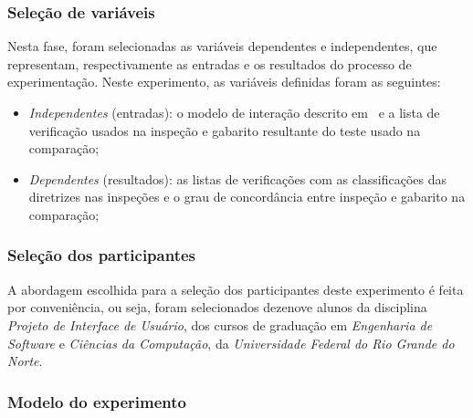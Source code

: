 \subsubsection{Seleção de variáveis}
\label{variablesSelection}

Nesta   fase,   foram   selecionadas   as  variáveis   dependentes   e
independentes,  que  representam,  respectivamente  as entradas  e  os
resultados  do  processo  de  experimentação.  Neste  experimento,  as
variáveis definidas foram as seguintes:

\begin{itemize}

  \item {\em Independentes} (entradas): o modelo de interação descrito
    em \aladim\ e a lista de verificação usados na inspeção e gabarito
    resultante do teste usado na comparação;

  \item {\em Dependentes} (resultados):  as listas de verificações com
    as  classificações  das  diretrizes  nas  inspeções e  o  grau  de
    concordância entre inspeção e gabarito na comparação;

\end{itemize}

\subsubsection{Seleção dos participantes}
\label{subjectsSelection}

A  abordagem   escolhida  para  a  seleção   dos  participantes  deste
experimento  é feita  por  conveniência, ou  seja, foram  selecionados
dezenove alunos  da disciplina {\em Projeto de  Interface de Usuário},
dos  cursos  de graduação  em  {\em  Engenharia  de Software}  e  {\em
  Ciências da Computação}, da  {\em Universidade Federal do Rio Grande
  do Norte}.

\subsubsection{Modelo do experimento}
\label{experimentDesign}

